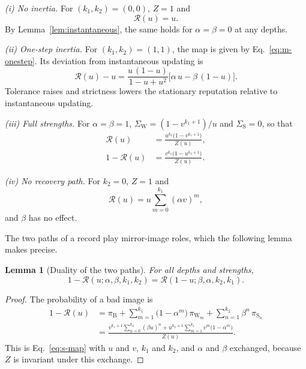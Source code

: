 \documentclass[10pt]{wlscirep}
\newcommand{\Rmap}{\mathscr{R}}            %
\newcommand{\st}[1]{\mathrm{#1}}           %
\theoremstyle{plain}
\newtheorem{lemma}{Lemma}
\theoremstyle{remark}
\begin{document}
\textit{(i) No inertia.} For $(k_1,k_2)=(0,0)$, $Z=1$ and
\begin{equation}
\Rmap(u)=u.
\label{eq:s-linear}
\end{equation}
By Lemma~\ref{lem:instantaneous}, the same holds for $\alpha=\beta=0$ at any depths.

\textit{(ii) One-step inertia.} For $(k_1,k_2)=(1,1)$, the map is given by Eq.~\eqref{eq:m-onestep}. Its deviation from instantaneous updating is
\begin{equation}
\Rmap(u)-u=\frac{u\,(1-u)}{1-u+u^2}\bigl[\alpha\,u-\beta\,(1-u)\bigr].
\label{eq:s-onestep}
\end{equation}
Tolerance raises and strictness lowers the stationary reputation relative to instantaneous updating.

\textit{(iii) Full strengths.} For $\alpha=\beta=1$, $\Sigma_{\mathrm W}=(1-v^{k_1+1})/u$ and $\Sigma_{\mathrm S}=0$, so that
\begin{equation}
\begin{aligned}
\Rmap(u)&=\frac{u^{k_2}\bigl(1-v^{k_1+1}\bigr)}{Z(u)},\\[2pt]
1-\Rmap(u)&=\frac{v^{k_1}\bigl(1-u^{k_2+1}\bigr)}{Z(u)}.
\end{aligned}
\label{eq:s-fullreadout}
\end{equation}

\textit{(iv) No recovery path.} For $k_2=0$, $Z=1$ and
\begin{equation}
\Rmap(u)=u\sum_{m=0}^{k_1}(\alpha v)^m,
\label{eq:s-norecovery}
\end{equation}
and $\beta$ has no effect.

The two paths of a record play mirror-image roles, which the following lemma makes precise.

\begin{lemma}[Duality of the two paths]\label{lem:duality}
For all depths and strengths,
\begin{equation}
1-\Rmap(u;\alpha,\beta,k_1,k_2)=\Rmap(1-u;\beta,\alpha,k_2,k_1).
\label{eq:s-duality}
\end{equation}
\end{lemma}
\begin{proof}
The probability of a bad image is
\begin{equation}
\begin{aligned}
1-\Rmap(u)&=\pi_{\st B}+\sum_{m=1}^{k_1}\bigl(1-\alpha^m\bigr)\,\pi_{\st W_m}+\sum_{n=1}^{k_2}\beta^n\,\pi_{\st S_n}\\
&=\frac{v^{k_1+1}\sum_{n=0}^{k_2}(\beta u)^n+u^{k_2+1}\sum_{m=1}^{k_1}v^m\bigl(1-\alpha^m\bigr)}{Z(u)}.
\end{aligned}
\label{eq:s-badimage}
\end{equation}
This is Eq.~\eqref{eq:s-map} with $u$ and $v$, $k_1$ and $k_2$, and $\alpha$ and $\beta$ exchanged, because $Z$ is invariant under this exchange.
\end{proof}
\end{document}
